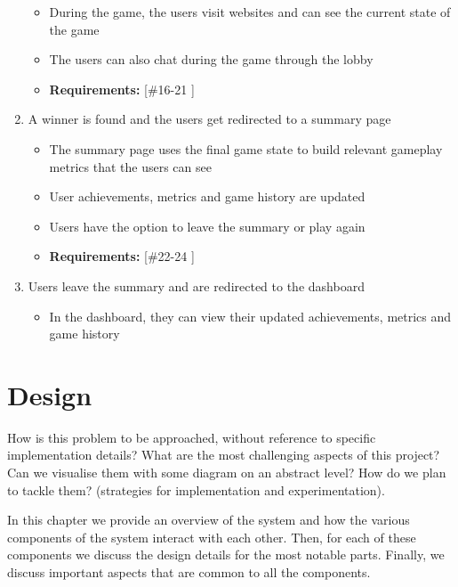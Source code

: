 \documentclass{l4proj}
\begin{document}
\begin{enumerate}
    \begin{itemize}
 	\item During the game, the users visit websites and can see the current state of the game 
           \item The users can also chat during the game through the lobby
 	\item \textbf{Requirements: } [\#16-21 ]
    \end{itemize}
    \item A winner is found and the users get redirected to a summary page
    \begin{itemize}
 	\item The summary page uses the final game state to build relevant gameplay metrics that the users can see  
           \item User achievements, metrics and game history are updated
           \item Users have the option to leave the summary or play again
 	\item \textbf{Requirements: } [\#22-24 ]
    \end{itemize}
    \item Users leave the summary and are redirected to the dashboard
    \begin{itemize}
        \item In the dashboard, they can view their updated achievements, metrics and game history
    \end{itemize}

\end{enumerate}


\chapter{Design}
How is this problem to be approached, without reference to specific implementation details? 
What are the most challenging aspects of this project? Can we visualise them with some diagram on an abstract level? How do we plan to tackle them? (strategies for implementation and experimentation).

In this chapter we provide an overview of the system and how the various components of the system interact with each other. Then, for each of these components we discuss the design details for the most notable parts. Finally, we discuss important aspects that are common to all the components. 
\end{document}
